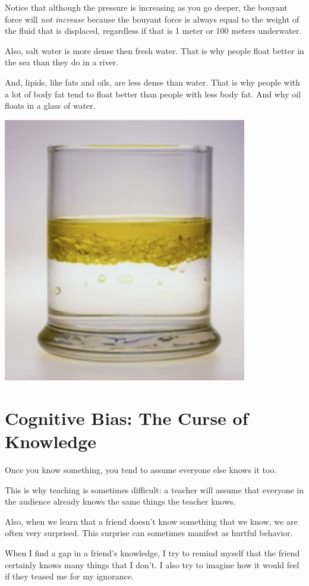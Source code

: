 Notice that although the pressure is increasing as you go deeper, the
bouyant force will \emph{not increase} because the bouyant force is always equal
to the weight of the fluid that is displaced, regardless if that is 1
meter or 100 meters underwater.

Also, salt water is more dense then fresh water. That is why people float
better in the sea than they do in a river.

And, lipids, like fats and oils, are less dense than water. That is why
people with a lot of body fat tend to float better than people with
less body fat. And why oil floats in a glass of water.

\includegraphics[width=0.8\textwidth]{Oil_Water.png}


\section{Cognitive Bias: The Curse of Knowledge}

Once you know something, you tend to assume everyone else knows it too.

This is why teaching is sometimes difficult: a teacher will assume
that everyone in the audience already knows the same things the
teacher knows.

Also, when we learn that a friend doesn't know something that we know,
we are often very surprised.  This surprise can sometimes manifest as
hurtful behavior.

When I find a gap in a friend's knowledge, I try to remind myself that
the friend certainly knows many things that I don't.  I also try to
imagine how it would feel if they teased me for my ignorance.
